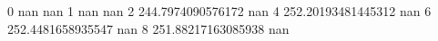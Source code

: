 0 nan nan
1 nan nan
2 244.7974090576172 nan
4 252.20193481445312 nan
6 252.4481658935547 nan
8 251.88217163085938 nan
